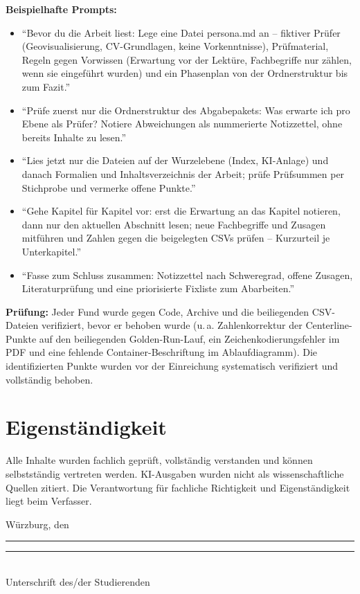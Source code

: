 \documentclass[12pt,a4paper]{article}
\begin{document}
\textbf{Beispielhafte Prompts:}
\begin{itemize}
  \item \enquote{Bevor du die Arbeit liest: Lege eine Datei persona.md an --
        fiktiver Prüfer (Geovisualisierung, CV-Grundlagen, keine
        Vorkenntnisse), Prüfmaterial, Regeln gegen Vorwissen (Erwartung vor
        der Lektüre, Fachbegriffe nur zählen, wenn sie eingeführt wurden) und
        ein Phasenplan von der Ordnerstruktur bis zum Fazit.}
  \item \enquote{Prüfe zuerst nur die Ordnerstruktur des Abgabepakets: Was
        erwarte ich pro Ebene als Prüfer? Notiere Abweichungen als
        nummerierte Notizzettel, ohne bereits Inhalte zu lesen.}
  \item \enquote{Lies jetzt nur die Dateien auf der Wurzelebene (Index,
        KI-Anlage) und danach Formalien und Inhaltsverzeichnis der Arbeit;
        prüfe Prüfsummen per Stichprobe und vermerke offene Punkte.}
  \item \enquote{Gehe Kapitel für Kapitel vor: erst die Erwartung an das
        Kapitel notieren, dann nur den aktuellen Abschnitt lesen; neue
        Fachbegriffe und Zusagen mitführen und Zahlen gegen die beigelegten
        CSVs prüfen -- Kurzurteil je Unterkapitel.}
  \item \enquote{Fasse zum Schluss zusammen: Notizzettel nach Schweregrad,
        offene Zusagen, Literaturprüfung und eine priorisierte Fixliste zum
        Abarbeiten.}
\end{itemize}

\textbf{Prüfung:} Jeder Fund wurde gegen Code, Archive und die beiliegenden
CSV-Dateien verifiziert, bevor er behoben wurde (u.\,a. Zahlenkorrektur der
Centerline-Punkte auf den beiliegenden Golden-Run-Lauf, ein
Zeichenkodierungsfehler im PDF und eine fehlende Container-Beschriftung im
Ablaufdiagramm). Die identifizierten Punkte wurden vor der Einreichung
systematisch verifiziert und vollständig behoben.

\section{Eigenständigkeit}

Alle Inhalte wurden fachlich geprüft, vollständig verstanden und können selbstständig vertreten werden. KI-Ausgaben wurden nicht als wissenschaftliche Quellen zitiert. Die Verantwortung für fachliche Richtigkeit und Eigenständigkeit liegt beim Verfasser.

\vfill
\noindent Würzburg, den \rule{4cm}{0.4pt}\hfill
\rule{6cm}{0.4pt}\\
\hfill Unterschrift des/der Studierenden
\end{document}
